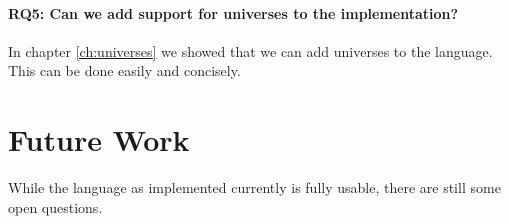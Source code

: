 \paragraph{RQ5: Can we add support for universes to the implementation?}
In chapter \ref{ch:universes} we showed that we can add universes to the language. This can be done easily and concisely.

\section{Future Work}
While the language as implemented currently is fully usable, there are still some open questions. 